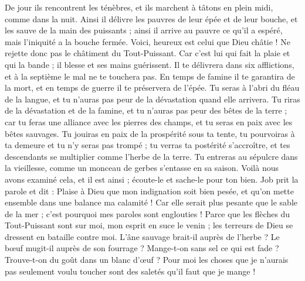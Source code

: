 \begin{multicols}{2}
De jour ils rencontrent les ténèbres, et ils marchent à tâtons en plein midi, comme dans la nuit.
Ainsi il délivre les pauvres de leur épée et de leur bouche, et les sauve de la main des puissants ;
ainsi il arrive au pauvre ce qu'il a espéré, mais l'iniquité a la bouche fermée.
Voici, heureux est celui que Dieu châtie ! Ne rejette donc pas le châtiment du Tout-Puissant.
Car c'est lui qui fait la plaie et qui la bande ; il blesse et ses mains guérissent.
Il te délivrera dans six afflictions, et à la septième le mal ne te touchera pas.
En temps de famine il te garantira de la mort, et en temps de guerre il te préservera de l'épée.
Tu seras à l'abri du fléau de la langue, et tu n'auras pas peur de la dévastation quand elle arrivera.
Tu riras de la dévastation et de la famine, et tu n'auras pas peur des bêtes de la terre ;
car tu feras une alliance avec les pierres des champs, et tu seras en paix avec les bêtes sauvages.
Tu jouiras en paix de la prospérité sous ta tente, tu pourvoiras à ta demeure et tu n'y seras pas trompé ;
tu verras ta postérité s'accroître, et tes descendants se multiplier comme l'herbe de la terre.
Tu entreras au sépulcre dans la vieillesse, comme un monceau de gerbes s'entasse en sa saison.
Voilà nous avons examiné cela, et il est ainsi ; écoute-le et sache-le pour ton bien.
\VerseOne{}Job prit la parole et dit :
Plaise à Dieu que mon indignation soit bien pesée, et qu'on mette ensemble dans une balance ma calamité !
Car elle serait plus pesante que le sable de la mer ; c'est pourquoi mes paroles sont englouties !
Parce que les flèches du Tout-Puissant sont sur moi, mon esprit en suce le venin ; les terreurs de Dieu se dressent en bataille contre moi.
L'âne sauvage brait-il auprès de l'herbe ? Le bœuf mugit-il auprès de son fourrage ?
Mange-t-on sans sel ce qui est fade ? Trouve-t-on du goût dans un blanc d'œuf ?
Pour moi les choses que je n'aurais pas seulement voulu toucher sont des saletés qu'il faut que je mange !

\end{multicols}
